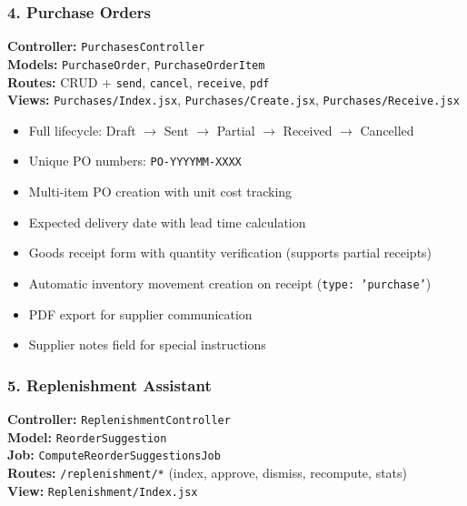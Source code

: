 \subsubsection{4. Purchase Orders}

\textbf{Controller:} \texttt{PurchasesController}\\
\textbf{Models:} \texttt{PurchaseOrder}, \texttt{PurchaseOrderItem}\\
\textbf{Routes:} CRUD + \texttt{send}, \texttt{cancel}, \texttt{receive}, \texttt{pdf}\\
\textbf{Views:} \texttt{Purchases/Index.jsx}, \texttt{Purchases/Create.jsx}, \texttt{Purchases/Receive.jsx}

\begin{itemize}
    \item Full lifecycle: Draft $\rightarrow$ Sent $\rightarrow$ Partial $\rightarrow$ Received $\rightarrow$ Cancelled
    \item Unique PO numbers: \texttt{PO-YYYYMM-XXXX}
    \item Multi-item PO creation with unit cost tracking
    \item Expected delivery date with lead time calculation
    \item Goods receipt form with quantity verification (supports partial receipts)
    \item Automatic inventory movement creation on receipt (\texttt{type: 'purchase'})
    \item PDF export for supplier communication
    \item Supplier notes field for special instructions
\end{itemize}

\subsubsection{5. Replenishment Assistant}

\textbf{Controller:} \texttt{ReplenishmentController}\\
\textbf{Model:} \texttt{ReorderSuggestion}\\
\textbf{Job:} \texttt{ComputeReorderSuggestionsJob}\\
\textbf{Routes:} \texttt{/replenishment/*} (index, approve, dismiss, recompute, stats)\\
\textbf{View:} \texttt{Replenishment/Index.jsx}

